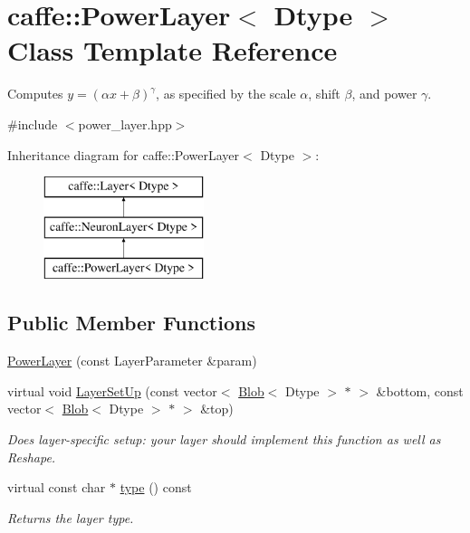 \hypertarget{classcaffe_1_1PowerLayer}{}\section{caffe\+:\+:Power\+Layer$<$ Dtype $>$ Class Template Reference}
\label{classcaffe_1_1PowerLayer}


Computes $ y = (\alpha x + \beta) ^ \gamma $, as specified by the scale $ \alpha $, shift $ \beta $, and power $ \gamma $.  




{\ttfamily \#include $<$power\+\_\+layer.\+hpp$>$}

Inheritance diagram for caffe\+:\+:Power\+Layer$<$ Dtype $>$\+:\begin{figure}[H]
\begin{center}
\leavevmode
\includegraphics[height=3.000000cm]{classcaffe_1_1PowerLayer}
\end{center}
\end{figure}
\subsection*{Public Member Functions}
\begin{DoxyCompactItemize}
\item 
\hyperlink{classcaffe_1_1PowerLayer_ab008c03c36436e1a0dac0fe1faa53c6d}{Power\+Layer} (const Layer\+Parameter \&param)
\item 
virtual void \hyperlink{classcaffe_1_1PowerLayer_aa8f097be5b0f8d7dd104e88dc2a2e544}{Layer\+Set\+Up} (const vector$<$ \hyperlink{classcaffe_1_1Blob}{Blob}$<$ Dtype $>$ $\ast$ $>$ \&bottom, const vector$<$ \hyperlink{classcaffe_1_1Blob}{Blob}$<$ Dtype $>$ $\ast$ $>$ \&top)
\begin{DoxyCompactList}\small\item\em Does layer-\/specific setup\+: your layer should implement this function as well as Reshape. \end{DoxyCompactList}\item 
virtual const char $\ast$ \hyperlink{classcaffe_1_1PowerLayer_a51ef88d67194814fe0f78dc1927f07a6}{type} () const \hypertarget{classcaffe_1_1PowerLayer_a51ef88d67194814fe0f78dc1927f07a6}{}\label{classcaffe_1_1PowerLayer_a51ef88d67194814fe0f78dc1927f07a6}

\begin{DoxyCompactList}\small\item\em Returns the layer type. \end{DoxyCompactList}\end{DoxyCompactItemize}
